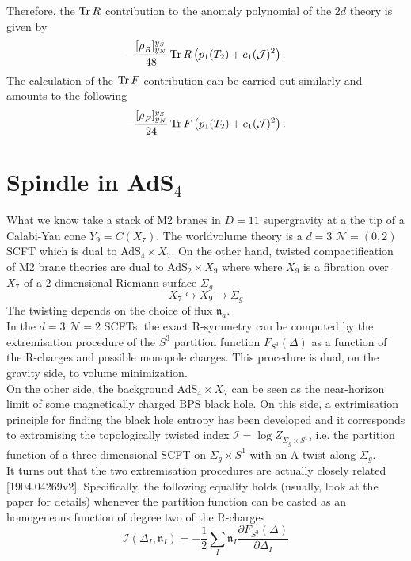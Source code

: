 \documentclass[11pt]{article}
\theoremstyle{definition}
\numberwithin{equation}{section}
\newcommand{\flux}[2][]{[\rho_{#2}^{#1}]^{y_S}_{y_N}}
\newcommand*\cI{\mathcal{I}}
\newcommand*\cN{\mathcal{N}}
\newcommand*\Frn{\mathfrak{n}}
\begin{document}
Therefore, the $\operatorname{Tr} R$ contribution to the anomaly polynomial of the $2d$ theory is given by
\begin{equation}
	-\frac{\flux{R}}{48}\Tr R\left(p_{1}(T_{2})+c_{1}(\mathcal{J})^{2}\right).
\end{equation}
The calculation of the $\operatorname{Tr} F$ contribution can be carried out similarly and amounts to the following 
\begin{equation}
	-\frac{\flux{F}}{24}\Tr F\left(p_{1}(T_{2})+c_{1}(\mathcal{J})^{2}\right).
\end{equation}


\section{Spindle in AdS$_{4}$}
What we know take a stack of M2 branes in $D=11$ supergravity at a the tip of a Calabi-Yau cone $Y_{9}=C(X_{7})$. The worldvolume theory is a $d=3$ $\cN=(0,2)$ SCFT which is dual to AdS$_{4}\times X_{7}$. On the other hand, twisted compactification of M2 brane theories are dual to AdS$_{2}\times X_{9}$ where where $X_{9}$ is a fibration over $X_{7}$ of a $2$-dimensional Riemann surface $\Sigma_{g}$
\begin{equation}
	X_{7}\hookrightarrow X_{9}\rightarrow \Sigma_{g}
\end{equation}
The twisting depends on the choice of flux $\Frn_{a}$.\\
In the $d=3$ $\cN=2$ SCFTs, the exact R-symmetry can be computed by the extremisation procedure of the $S^{3}$ partition function $F_{S^{3}}(\Delta)$ as a function of the R-charges and possible monopole charges. This procedure is dual, on the gravity side, to volume minimization.\\
On the other side, the background AdS$_{4}\times X_{7}$ can be seen as the near-horizon limit of some magnetically charged BPS black hole. On this side, a extrimisation principle for finding the black hole entropy has been developed and it corresponds to extramising the topologically twisted index $\cI=\log Z_{\Sigma_{g}\times S^{1}}$, i.e. the partition function of a three-dimensional SCFT on $\Sigma_{g}\times S^{1}$ with an A-twist along $\Sigma_{g}$.\\
It turns out that the two extremisation procedures are actually closely related [1904.04269v2]. Specifically, the following equality holds (usually, look at the paper for details) whenever the partition function can be casted as an homogeneous function of degree two of the R-charges
\begin{equation}
	\mathcal{I}(\Delta_{I},\Frn_{I})=-\frac{1}{2}\sum_{I}\Frn_{I}\frac{\partial F_{S^{3}}(\Delta)}{\partial\Delta_{I}}
\end{equation}
\end{document}
